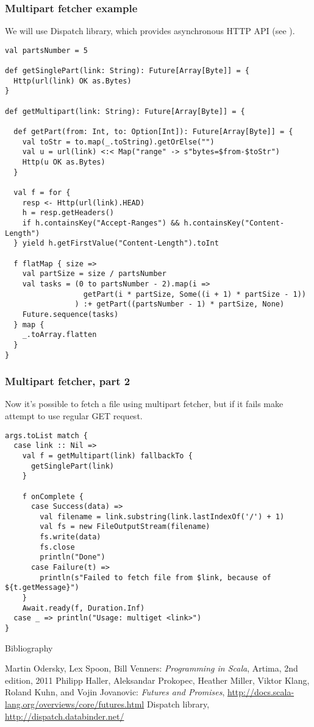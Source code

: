 \begin{frame}[fragile]
\frametitle{Multipart fetcher example}
We will use Dispatch library, which provides asynchronous HTTP API (see \cite{dispatch}).
\begin{lstlisting}[name=multifetch]
val partsNumber = 5

def getSinglePart(link: String): Future[Array[Byte]] = {
  Http(url(link) OK as.Bytes)
}

def getMultipart(link: String): Future[Array[Byte]] = {

  def getPart(from: Int, to: Option[Int]): Future[Array[Byte]] = {
    val toStr = to.map(_.toString).getOrElse("")
    val u = url(link) <:< Map("range" -> s"bytes=$from-$toStr")
    Http(u OK as.Bytes)
  }

  val f = for {
    resp <- Http(url(link).HEAD)
    h = resp.getHeaders()
    if h.containsKey("Accept-Ranges") && h.containsKey("Content-Length")
  } yield h.getFirstValue("Content-Length").toInt

  f flatMap { size =>
    val partSize = size / partsNumber
    val tasks = (0 to partsNumber - 2).map(i =>
                  getPart(i * partSize, Some((i + 1) * partSize - 1))
                ) :+ getPart((partsNumber - 1) * partSize, None)
    Future.sequence(tasks)
  } map {
    _.toArray.flatten
  }
}
\end{lstlisting}
\end{frame}

\begin{frame}[fragile]
\frametitle{Multipart fetcher, part 2}
Now it's possible to fetch a file using multipart fetcher, but if it fails make attempt to use
regular GET request.
\begin{lstlisting}[name=multifetch]
args.toList match {
  case link :: Nil =>
    val f = getMultipart(link) fallbackTo {
      getSinglePart(link)
    } 
    
    f onComplete {
      case Success(data) =>
        val filename = link.substring(link.lastIndexOf('/') + 1)
        val fs = new FileOutputStream(filename)
        fs.write(data)
        fs.close
        println("Done")
      case Failure(t) =>
        println(s"Failed to fetch file from $link, because of ${t.getMessage}")
    }
    Await.ready(f, Duration.Inf)
  case _ => println("Usage: multiget <link>")
}
\end{lstlisting}
\end{frame}


\begin{frame}{Bibliography}
\begin{thebibliography}{00}
Martin Odersky, Lex Spoon, Bill Venners:
\emph{Programming in Scala},
Artima, 2nd edition, 2011
Philipp Haller, Aleksandar Prokopec, Heather Miller, Viktor Klang, Roland Kuhn, and Vojin Jovanovic:
\emph{Futures and Promises}, \url{http://docs.scala-lang.org/overviews/core/futures.html}
Dispatch library, \url{http://dispatch.databinder.net/}
\end{thebibliography}
\end{frame}




